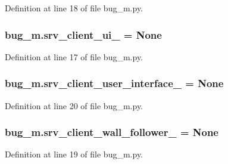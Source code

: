Definition at line 18 of file bug\+\_\+m.\+py.

\subsubsection[{\texorpdfstring{srv\+\_\+client\+\_\+ui\+\_\+}{srv_client_ui_}}]{\setlength{\rightskip}{0pt plus 5cm}bug\+\_\+m.\+srv\+\_\+client\+\_\+ui\+\_\+ = None}\hypertarget{namespacebug__m_adc5006acf60c13dce69dfffa2e1d0e2a}{}\label{namespacebug__m_adc5006acf60c13dce69dfffa2e1d0e2a}


Definition at line 17 of file bug\+\_\+m.\+py.

\subsubsection[{\texorpdfstring{srv\+\_\+client\+\_\+user\+\_\+interface\+\_\+}{srv_client_user_interface_}}]{\setlength{\rightskip}{0pt plus 5cm}bug\+\_\+m.\+srv\+\_\+client\+\_\+user\+\_\+interface\+\_\+ = None}\hypertarget{namespacebug__m_ac6217733c79e361a3bf86e4f51b6ecfd}{}\label{namespacebug__m_ac6217733c79e361a3bf86e4f51b6ecfd}


Definition at line 20 of file bug\+\_\+m.\+py.

\subsubsection[{\texorpdfstring{srv\+\_\+client\+\_\+wall\+\_\+follower\+\_\+}{srv_client_wall_follower_}}]{\setlength{\rightskip}{0pt plus 5cm}bug\+\_\+m.\+srv\+\_\+client\+\_\+wall\+\_\+follower\+\_\+ = None}\hypertarget{namespacebug__m_af40e8063430e5b54ef2f3f8368338744}{}\label{namespacebug__m_af40e8063430e5b54ef2f3f8368338744}


Definition at line 19 of file bug\+\_\+m.\+py.

